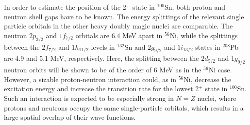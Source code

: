 \documentclass[twoside,12pt]{article}
\begin{document}
In order to estimate the position of the 2$^+$ state in $^{100}$Sn,  
both proton and neutron shell gaps have to be known.
The energy splittings of the relevant single 
particle orbitals in the other heavy doubly magic nuclei are comparable. The 
neutron $2p_{3/2}$ and $1f_{7/2}$ orbitals are 6.4 MeV apart in $^{56}$Ni, 
while the splittings between the $2f_{7/2}$ and $1h_{11/2}$ levels 
in $^{132}$Sn and $2g_{9/2}$ 
and $1i_{13/2}$ states in $^{208}$Pb are 4.9 and 5.1 MeV, respectively.  
Here, the splitting between the $2d_{5/2}$ and $1g_{9/2}$ neutron orbits 
will be shown to be of the order of 6 MeV as in 
the $^{56}$Ni case. However, a sizable proton-neutron
interaction could, as in $^{56}$Ni, decrease the 
excitation energy and increase the transition rate for the lowest 2$^+$ 
state in $^{100}$Sn. Such an interaction is expected to be especially strong 
in $N$$=$$Z$ nuclei, where protons and neutrons occupy the same 
single-particle orbitals, which results in a large spatial
overlap of their wave functions.
\end{document}
